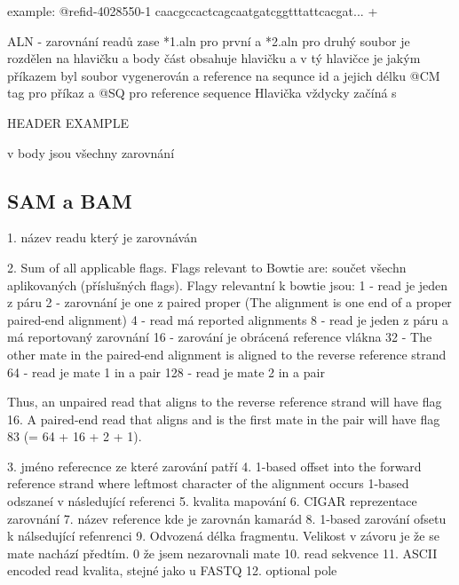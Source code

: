 \documentclass[czech,DP]{thesiskiv}
\numberwithin{equation}{section}
\begin{document}
example:
		@refid-4028550-1 
		caacgccactcagcaatgatcggtttattcacgat...
		+ 

ALN - zarovnání readů
zase *1.aln pro první a *2.aln pro druhý
soubor je rozdělen na hlavičku a body část
obsahuje hlavičku a v tý hlavičce je jakým příkazem byl soubor vygenerován a reference na sequnce id a jejich délku
@CM tag pro příkaz a
@SQ pro reference sequence
Hlavička vždycky začíná s 

		HEADER EXAMPLE

		
v body jsou všechny zarovnání 

\subsection{SAM a BAM}
1. název readu který je zarovnáván

2. Sum of all applicable flags. Flags relevant to Bowtie are:
součet všechn aplikovaných (příslušných flags). Flagy relevantní k bowtie jsou: 
1 - read je jeden z páru
2 - zarovnání je one z paired proper (The alignment is one end of a proper paired-end alignment)
4 - read má reported alignments
8 - read je jeden z páru a má reportovaný zarovnání
16 - zarování je obrácená reference vlákna
32 - The other mate in the paired-end alignment is aligned to the reverse reference strand
64 - read je mate 1 in a pair
128 - read je mate 2 in a pair

Thus, an unpaired read that aligns to the reverse reference strand will have flag 16. A paired-end read that aligns and is the first mate in the pair will have flag 83 (= 64 + 16 + 2 + 1).

3. jméno referecnce ze které zarování patří
4. 1-based offset into the forward reference strand where leftmost character of the alignment occurs 1-based odszaneí v následující referenci 
5. kvalita mapování
6. CIGAR reprezentace zarovnání
7. název reference kde je zarovnán kamarád 
8. 1-based zarování ofsetu k nálsedující refenrenci 
9. Odvozená délka fragmentu. Velikost v závoru je že se mate nachází předtím. 0 že jsem nezarovnali mate
10. read sekvence
11. ASCII encoded read kvalita, stejné jako u FASTQ
12. optional pole
\end{document}
